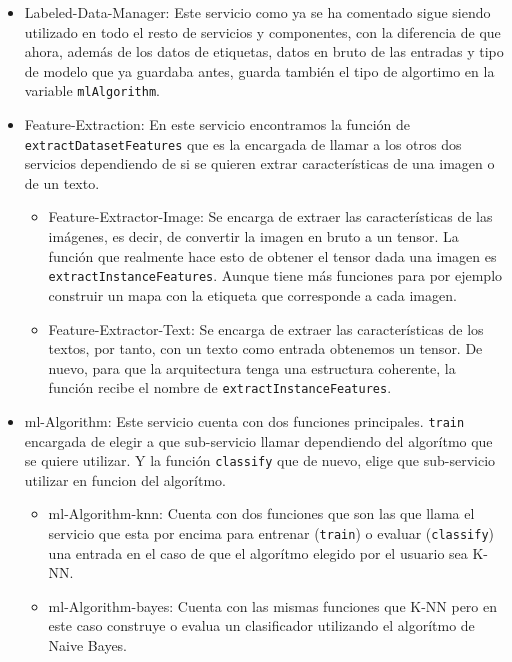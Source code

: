 \documentclass[a4paper, 12pt]{book}
\begin{document}
\begin{itemize}
  
	\item Labeled-Data-Manager: Este servicio como ya se ha comentado sigue siendo utilizado en todo el resto de servicios y componentes, con la diferencia de que ahora, además de los datos de etiquetas, datos en bruto de las entradas y tipo de modelo que ya guardaba antes, guarda también el tipo de algortimo en la variable \texttt{mlAlgorithm}.
 
	\item Feature-Extraction: En este servicio encontramos la función de \texttt{extractDatasetFeatures} que es la encargada de llamar a los otros dos servicios dependiendo de si se quieren extrar características de una imagen o de un texto.
\begin{itemize}
  
	\item Feature-Extractor-Image: Se encarga de extraer las características de las imágenes, es decir, de convertir la imagen en bruto a un tensor. La función que realmente hace esto de obtener el tensor dada una imagen es \texttt{extractInstanceFeatures}. Aunque tiene más funciones para por ejemplo construir un mapa con la etiqueta que corresponde a cada imagen.

	\item Feature-Extractor-Text: Se encarga de extraer las características de los textos, por tanto, con un texto como entrada obtenemos un tensor. De nuevo, para que la arquitectura tenga una estructura coherente, la función recibe el nombre de \texttt{extractInstanceFeatures}. 
\end{itemize}

	\item ml-Algorithm: Este servicio cuenta con dos funciones principales. \texttt{train} encargada de elegir a que sub-servicio llamar dependiendo del algorítmo que se quiere utilizar. Y la función \texttt{classify} que de nuevo, elige que sub-servicio utilizar en funcion del algorítmo.
\begin{itemize}
  
	\item ml-Algorithm-knn: Cuenta con dos funciones que son las que llama el servicio que esta por encima para entrenar (\texttt{train}) o evaluar  (\texttt{classify}) una entrada en el caso de que el algorítmo elegido por el usuario sea K-NN.

	\item ml-Algorithm-bayes: Cuenta con las mismas funciones que K-NN pero en este caso construye o evalua un clasificador utilizando el algorítmo de Naive Bayes.
\end{itemize}


\end{itemize}
\end{document}
